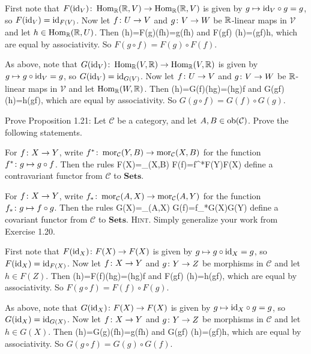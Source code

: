 \bs
\ben[label=(\alph*)]
\item First note that $F(\mathrm{id}_V)\colon  \operatorname{Hom}_{\mathbb{R}}(\mathbb{R}, V)\to  \operatorname{Hom}_{\mathbb{R}}(\mathbb{R}, V)$ is given by $g\mapsto \mathrm{id}_V\circ g=g$, so $F(\mathrm{id}_V)=\mathrm{id}_{F(V)}$. Now let $f\colon U\to V$ and $g\colon V\to W$ be $\mathbb{R}$-linear maps in $\mathcal{V}$ and let $h\in \operatorname{Hom}_{\mathbb{R}}(\mathbb{R}, U)$. 
Then
\bse
[F(g)\circ F(f)] (h)=F(g)(f\circ h)=g\circ (f\circ h)
\ese
and
\bse
F(g\circ f) (h)=(g\circ f)\circ h,
\ese
which are equal by associativity. So $F(g\circ f) =F(g)\circ F(f)$.
\item As above, note that $G(\mathrm{id}_V)\colon \operatorname{Hom}_{\mathbb{R}}(V,\mathbb{R})\to \operatorname{Hom}_{\mathbb{R}}(V,\mathbb{R})$ is given by $g\mapsto g\circ \mathrm{id}_V=g$, so $G(\mathrm{id}_V)=\mathrm{id}_{G(V)}$. Now let $f\colon U\to V$ and $g\colon V\to W$ be $\mathbb{R}$-linear maps in $\mathcal{V}$ and let $\operatorname{Hom}_{\mathbb{R}}(W,\mathbb{R})$. Then
\bse
[G(f)\circ g(g)] (h)=G(f)(h\circ g)=(h\circ g)\circ f
\ese
and
\bse
G(g\circ f) (h)=h\circ (g\circ f),
\ese
which are equal by associativity. So $G(g\circ f) =G(f)\circ G(g)$.
\een
\es

\addtocounter{exercise}{1}
\bp
Prove Proposition 1.21: Let $\mathcal{C}$ be a category, and let $A,B\in \operatorname{ob}(\mathcal{C})$. Prove the following statements.
\ben[label=(\alph*)]
\item For $f\colon X\to Y$, write $f^*\colon\operatorname{mor}_{\mathcal{C}}(Y,B)\to\operatorname{mor}_{\mathcal{C}}(X,B)$ for the function $f^*\colon g\mapsto g\circ f$. Then the rules
\bse
F(X)=\mor_{}(X,B) \qquad {} \qquad F(f)=f^*\cl F(Y)\to F(X)
\ese
define a contravariant functor from $\mathcal{C}$ to $\mathbf{Sets}$.
\item For $f\colon X\to Y$, write $f_*\colon\operatorname{mor}_{\mathcal{C}}(A,X)\to\operatorname{mor}_{\mathcal{C}}(A,Y)$ for the function $f_*\colon g\mapsto f\circ g$. Then the rules
\bse
G(X)=\mor_{}(A,X) \qquad {} \qquad G(f)=f_*\cl G(X)\to G(Y)
\ese
define a covariant functor from $\mathcal{C}$ to $\mathbf{Sets}$.
\een
{\scshape Hint}. Simply generalize your work from Exercise 1.20.
\ep

\bs
\ben[label=(\alph*)]
\item First note that $F(\mathrm{id}_X)\colon F(X)\to F(X)$ is given by $g\mapsto g\circ \mathrm{id}_X=g$, so $F(\mathrm{id}_X)=\mathrm{id}_{F(X)}$. Now let $f\colon X\to Y$ and $g\colon Y\to Z$ be morphisms in $\mathcal{C}$ and let $h\in F(Z)$. Then
\bse
[F(f)\circ F(g)] (h)=F(f)(h\circ g)=(h\circ g)\circ f
\ese
and
\bse
F(g\circ f) (h)=h\circ (g\circ f),
\ese
which are equal by associativity. So $F(g\circ f) =F(f)\circ F(g)$.
\item As above, note that $G(\mathrm{id}_X)\colon F(X)\to F(X)$ is given by $g\mapsto \mathrm{id}_X\circ g=g$, so $G(\mathrm{id}_X)=\mathrm{id}_{G(X)}$. Now let $f\colon X\to Y$ and $g\colon Y\to Z$ be morphisms in $\mathcal{C}$ and let $h\in G(X)$. Then
\bse
[G(g)\circ G(f)] (h)=G(g)(f\circ h)=g\circ (f\circ h)
\ese
and
\bse
G(g\circ f) (h)=(g\circ f)\circ h,
\ese
which are equal by associativity. So $G(g\circ f) =G(g)\circ G(f)$.
\een
\es


